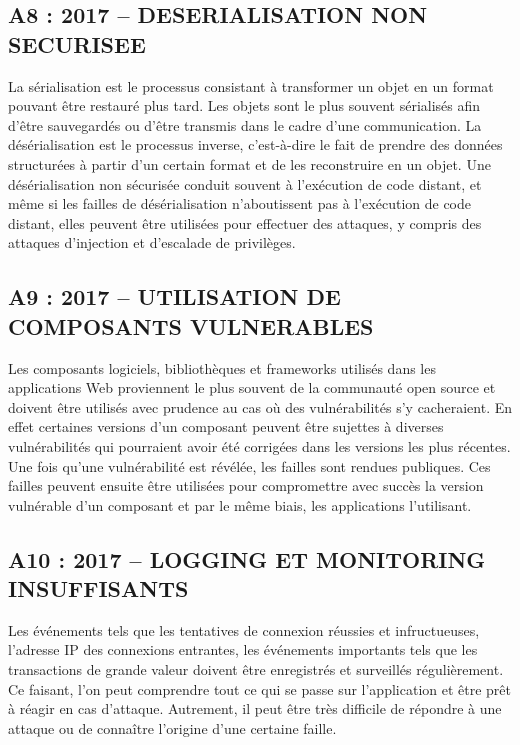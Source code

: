 \subsection{A8 : 2017 – DESERIALISATION NON SECURISEE}
La sérialisation est le processus consistant à transformer un objet en un format pouvant être restauré plus tard. Les objets sont le plus souvent sérialisés afin d’être sauvegardés ou d’être transmis dans le cadre d’une communication. La désérialisation est le processus inverse, c'est-à-dire le fait de prendre des données structurées à partir d'un certain format et de les reconstruire en un objet. Une désérialisation non sécurisée conduit souvent à l'exécution de code distant, et même si les failles de désérialisation n'aboutissent pas à l'exécution de code distant, elles peuvent être utilisées pour effectuer des attaques, y compris des attaques d'injection et d'escalade de privilèges.
\subsection{A9 : 2017 – UTILISATION DE COMPOSANTS VULNERABLES}
Les composants logiciels, bibliothèques et frameworks utilisés dans les applications Web proviennent le plus souvent de la communauté open source et doivent être utilisés avec prudence au cas où des vulnérabilités s’y cacheraient. En effet certaines versions d’un composant peuvent être sujettes à diverses vulnérabilités qui pourraient avoir été corrigées dans les versions les plus récentes. Une fois qu'une vulnérabilité est révélée, les failles sont rendues publiques. Ces failles peuvent ensuite être utilisées pour compromettre avec succès la version vulnérable d’un composant et par le même biais, les applications l’utilisant.
\subsection{A10 : 2017 – LOGGING ET MONITORING INSUFFISANTS}
Les événements tels que les tentatives de connexion réussies et infructueuses, l'adresse IP des connexions entrantes, les événements importants tels que les transactions de grande valeur doivent être enregistrés et surveillés régulièrement. Ce faisant, l’on peut comprendre tout ce qui se passe sur l’application et être prêt à réagir en cas d’attaque. Autrement, il peut être très difficile de répondre à une attaque ou de connaître l’origine d’une certaine faille.
